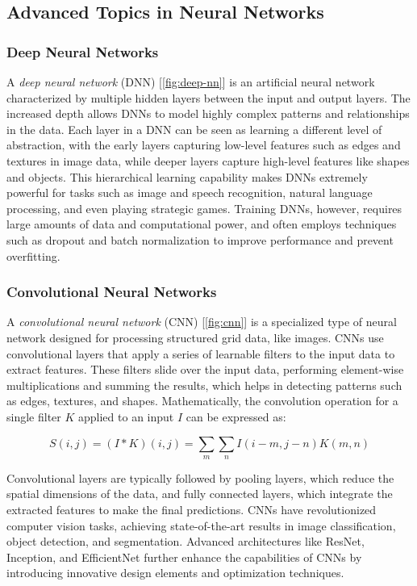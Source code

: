 \documentclass[../Thesis.tex]{subfiles}
\begin{document}
	
	
	\subsection{Advanced Topics in Neural Networks}
	
	\subsubsection{Deep Neural Networks}
	A \emph{deep neural network} (DNN) [\autoref{fig:deep-nn}] is an artificial neural network characterized by multiple hidden layers between the input and output layers. The increased depth allows DNNs to model highly complex patterns and relationships in the data. Each layer in a DNN can be seen as learning a different level of abstraction, with the early layers capturing low-level features such as edges and textures in image data, while deeper layers capture high-level features like shapes and objects. This hierarchical learning capability makes DNNs extremely powerful for tasks such as image and speech recognition, natural language processing, and even playing strategic games. Training DNNs, however, requires large amounts of data and computational power, and often employs techniques such as dropout and batch normalization to improve performance and prevent overfitting.
	
	
	
	\subsubsection{Convolutional Neural Networks}
	A \emph{convolutional neural network} (CNN) [\autoref{fig:cnn}] is a specialized type of neural network designed for processing structured grid data, like images. CNNs use convolutional layers that apply a series of learnable filters to the input data to extract features. These filters slide over the input data, performing element-wise multiplications and summing the results, which helps in detecting patterns such as edges, textures, and shapes. Mathematically, the convolution operation for a single filter \(K\) applied to an input \(I\) can be expressed as:
	
	\[
	S(i, j) = (I * K)(i, j) = \sum_{m} \sum_{n} I(i - m, j - n) K(m, n)
	\]
	
	Convolutional layers are typically followed by pooling layers, which reduce the spatial dimensions of the data, and fully connected layers, which integrate the extracted features to make the final predictions. CNNs have revolutionized computer vision tasks, achieving state-of-the-art results in image classification, object detection, and segmentation. Advanced architectures like ResNet, Inception, and EfficientNet further enhance the capabilities of CNNs by introducing innovative design elements and optimization techniques.
	
\end{document}
